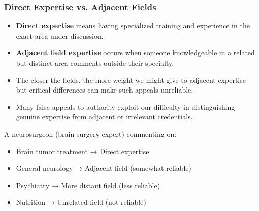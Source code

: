 \documentclass{beamer}
\begin{document}
	
	
	\begin{frame}
		\frametitle{Direct Expertise vs. Adjacent Fields}
		\begin{itemize}
			\item \textbf{Direct expertise} means having specialized training and experience in the exact area under discussion.
			\item \textbf{Adjacent field expertise} occurs when someone knowledgeable in a related but distinct area comments outside their specialty.
			\item The closer the fields, the more weight we might give to adjacent expertise—but critical differences can make such appeals unreliable.
			\item Many false appeals to authority exploit our difficulty in distinguishing genuine expertise from adjacent or irrelevant credentials.
		\end{itemize}
		
		\begin{example}
			A neurosurgeon (brain surgery expert) commenting on:
			\begin{itemize}
				\item Brain tumor treatment → Direct expertise 
				\item General neurology → Adjacent field (somewhat reliable)
				\item Psychiatry → More distant field (less reliable)
				\item Nutrition → Unrelated field (not reliable)
			\end{itemize}
		\end{example}
	\end{frame}
	
\end{document}
